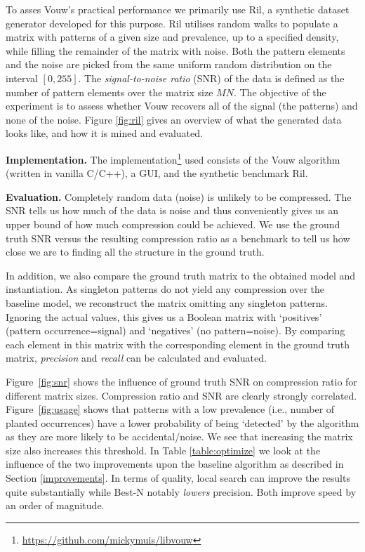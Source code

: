 \documentclass{llncs}
\begin{document}
To asses Vouw's practical performance we primarily use Ril, a synthetic dataset generator developed for this purpose. Ril utilises random walks to populate a matrix with patterns of a given size and prevalence, up to a specified density, while filling the remainder of the matrix with noise. Both the pattern elements and the noise are picked from the same uniform random distribution on the interval $[0,255]$. The \emph{signal-to-noise ratio} (SNR) of the data is defined as the number of pattern elements over the matrix size $MN$. The objective of the experiment is to assess whether Vouw recovers all of the signal (the patterns) and none of the noise. Figure \ref{fig:ril} gives an overview of what the generated data looks like, and how it is mined and evaluated.

\smallskip \noindent \textbf{Implementation.} %
The implementation\footnote{\url{https://github.com/mickymuis/libvouw}} used consists of the Vouw algorithm (written in vanilla C/C++), a GUI, and the synthetic benchmark Ril. 

\smallskip \noindent \textbf{Evaluation.} %
Completely random data (noise) is unlikely to be compressed. The SNR tells us how much of the data is noise and thus conveniently gives us an upper bound of how much compression could be achieved. We use the ground truth SNR versus the resulting compression ratio as a benchmark to tell us how close we are to finding all the structure in the ground truth. 

In addition, we also compare the ground truth matrix to the obtained model and instantiation. As singleton patterns do not yield any compression over the baseline model, we reconstruct the matrix omitting any singleton patterns. Ignoring the actual values, this gives us a Boolean matrix with `positives' (pattern occurrence=signal) and `negatives' (no pattern=noise). By comparing each element in this matrix with the corresponding element in the ground truth matrix, \emph{precision} and \emph{recall} can be calculated and evaluated.

Figure~\ref{fig:snr} shows the influence of ground truth SNR on compression ratio for different matrix sizes. Compression ratio and SNR are clearly strongly correlated. Figure~\ref{fig:usage} shows that patterns with a low prevalence (i.e., number of planted occurrences) have a lower probability of being `detected' by the algorithm as they are more likely to be accidental/noise. We see that increasing the matrix size also increases this threshold. In Table \ref{table:optimize} we look at the influence of the two improvements upon the baseline algorithm as described in Section \ref{improvements}. In terms of quality, local search can improve the results quite substantially while Best-N notably \emph{lowers} precision. Both improve speed by an order of magnitude.%
\end{document}
